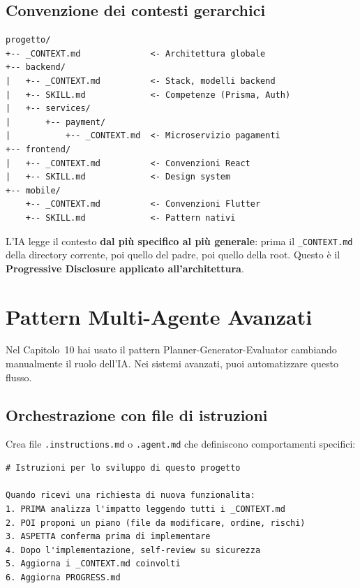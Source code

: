 \subsection{Convenzione dei contesti gerarchici}

\begin{lstlisting}[language={}]
progetto/
+-- _CONTEXT.md              <- Architettura globale
+-- backend/
|   +-- _CONTEXT.md          <- Stack, modelli backend
|   +-- SKILL.md             <- Competenze (Prisma, Auth)
|   +-- services/
|       +-- payment/
|           +-- _CONTEXT.md  <- Microservizio pagamenti
+-- frontend/
|   +-- _CONTEXT.md          <- Convenzioni React
|   +-- SKILL.md             <- Design system
+-- mobile/
    +-- _CONTEXT.md          <- Convenzioni Flutter
    +-- SKILL.md             <- Pattern nativi
\end{lstlisting}

L'IA legge il contesto \textbf{dal più specifico al più generale}: prima il \texttt{\_CONTEXT.md} della directory corrente, poi quello del padre, poi quello della root. Questo è il \textbf{Progressive Disclosure applicato all'architettura}.

\section{Pattern Multi-Agente Avanzati}

Nel Capitolo~10 hai usato il pattern Planner-Generator-Evaluator cambiando manualmente il ruolo dell'IA. Nei sistemi avanzati, puoi automatizzare questo flusso.

\subsection{Orchestrazione con file di istruzioni}

Crea file \texttt{.instructions.md} o \texttt{.agent.md} che definiscono comportamenti specifici:

\begin{lstlisting}[language={},title={.github/copilot-instructions.md}]
# Istruzioni per lo sviluppo di questo progetto

Quando ricevi una richiesta di nuova funzionalita:
1. PRIMA analizza l'impatto leggendo tutti i _CONTEXT.md
2. POI proponi un piano (file da modificare, ordine, rischi)
3. ASPETTA conferma prima di implementare
4. Dopo l'implementazione, self-review su sicurezza
5. Aggiorna i _CONTEXT.md coinvolti
6. Aggiorna PROGRESS.md
\end{lstlisting}

